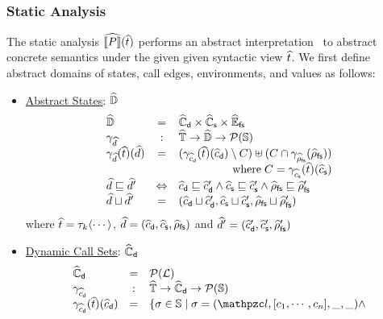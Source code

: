 \subsubsection{Static Analysis}

The static analysis $\widehat{\llbracket{P}\rrbracket}(\widehat{t})$ performs an abstract
interpretation~\cite{ai1977, ai1992} to abstract concrete semantics under the
given given syntactic view $\widehat{t}$.  We first define abstract domains of
states, call edges, environments, and values as follows:
\begin{itemize}
  \item \underline{Abstract States}: $\widehat{\mathbb{D}}$
    \[
      \begin{array}{lcl}
        \aelemset &=& \adcallset \times \ascallset \times \afsenvset\\

        \aelemgamma &:& \atreeset \rightarrow \aelemset \rightarrow
        \powerset{\stset}\\

        \aelemgamma(\atree)(\aelem) &=&
        (\adcallgamma(\atree)(\adcall) \setminus C) \uplus
        (C \cap \afsenvgamma(\afsenv))\\
        \multicolumn{3}{r}{\text{where} \; C = \ascallgamma(\atree)(\ascall)}\\

        \aelem \order \aelem' &\Leftrightarrow&
        \adcall \order \adcall' \wedge
        \ascall \order \ascall' \wedge
        \afsenv \order \afsenv'\\

        \aelem \join \aelem' &=&
        (\adcall \join \adcall', \ascall \join \ascall', \afsenv \join \afsenv')\\
      \end{array}
    \]
    where $\widehat{t} = \tau_k \langle \cdots \rangle$, $\widehat{d} = (\widehat{c}_{\textsf{d}}, \widehat{c}_{\textsf{s}},
    \widehat{\rho}_{\textsf{fs}})$ and $\widehat{d}' = (\widehat{c}_{\textsf{d}}', \widehat{c}_{\textsf{s}}', \widehat{\rho}_{\textsf{fs}}')$

  \item \underline{Dynamic Call Sets}: $\widehat{\mathbb{C}}_{\textsf{d}}$
    \[
      \begin{array}{lcl}
        \adcallset &=& \powerset{\labset}\\

        \adcallgamma &:& \atreeset \rightarrow \adcallset \rightarrow
        \powerset{\stset}\\

        \adcallgamma(\atree)(\adcall) &=& \{ \st \in \stset \mid
          \st = (\lab, [\ctxt_1, \cdots, \ctxt_n], \_, \_) \wedge\\&&


\end{array}\]
\end{itemize}

